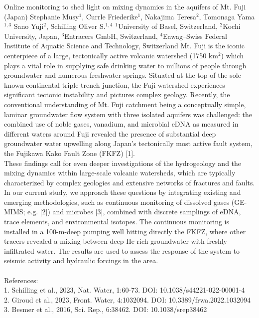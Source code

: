 \begin{conf-abstract}
{Online monitoring to shed light on mixing dynamics in the aquifers of Mt. Fuji (Japan)}
{Stephanie Musy$\mathrm{^1}$, Currle Friederike$\mathrm{^1}$, Nakajima Teresa$\mathrm{^2}$, Tomonaga Yama$\mathrm{^{1,3}}$ Sano Yuji$\mathrm{^2}$, Schilling Oliver S.$\mathrm{^{1,4}}$}
{$\mathrm{^1}$University of Basel, Switzerland, $\mathrm{^2}$Kochi University, Japan, $\mathrm{^3}$Entracers GmbH, Switzerland, $\mathrm{^4}$Eawag–Swiss Federal Institute of Aquatic Science and Technology, Switzerland}
{
Mt. Fuji is the iconic centerpiece of a large, tectonically active volcanic watershed (1750 $\mathrm{km^2}$) which plays a vital role in supplying safe drinking water to millions of people through groundwater and numerous freshwater springs. Situated at the top of the sole known continental triple-trench junction, the Fuji watershed experiences significant tectonic instability and pictures complex geology. Recently, the conventional understanding of Mt. Fuji catchment being a conceptually simple, laminar groundwater flow system with three isolated aquifers was challenged: the combined use of noble gases, vanadium, and microbial eDNA as measured in different waters around Fuji revealed the presence of substantial deep groundwater water upwelling along Japan’s tectonically most active fault system, the Fujikawa Kako Fault Zone (FKFZ) [1].\\

These findings call for even deeper investigations of the hydrogeology and the mixing dynamics within large-scale volcanic watersheds, which are typically characterized by complex geologies and extensive networks of fractures and faults. In our current study, we approach these questions by integrating existing and emerging methodologies, such as continuous monitoring of dissolved gases (GE-MIMS; e.g. [2]) and microbes [3], combined with discrete samplings of eDNA, trace elements, and environmental isotopes. The continuous monitoring is installed in a 100-m-deep pumping well hitting directly the FKFZ, where other tracers revealed a mixing between deep He-rich groundwater with freshly infiltrated water. The results are used to assess the response of the system to seismic activity and hydraulic forcings in the area. 
\\
\\
References:\\
1. Schilling et al., 2023, Nat. Water, 1:60-73. DOI: 10.1038/s44221-022-00001-4\\
2. Giroud et al., 2023, Front. Water, 4:1032094. DOI: 10.3389/frwa.2022.1032094\\
3. Besmer et al., 2016, Sci. Rep., 6:38462. DOI: 10.1038/srep38462
}
\end{conf-abstract}